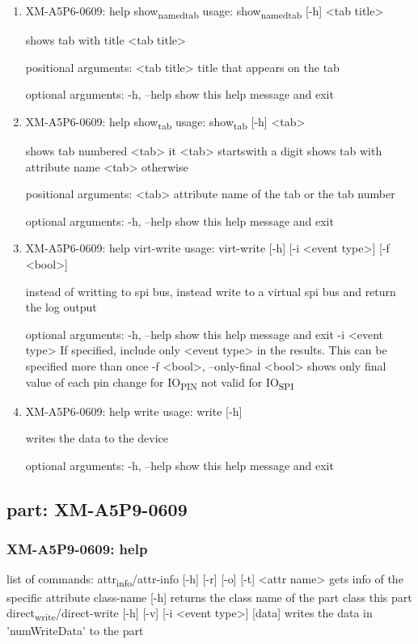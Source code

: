 \documentclass[11pt]{article}
\begin{document}
\begin{enumerate}
\item XM-A5P6-0609: help show\textsubscript{named}\textsubscript{tab}
\label{sec:orga716609}
usage: show\textsubscript{named}\textsubscript{tab} [-h] <tab title>

shows tab with title <tab title>

positional arguments:
  <tab title>  title that appears on the tab

optional arguments:
  -h, --help   show this help message and exit

\item XM-A5P6-0609: help show\textsubscript{tab}
\label{sec:org35d2d2b}
usage: show\textsubscript{tab} [-h] <tab>

shows tab numbered <tab> it <tab> startswith a digit shows tab with attribute
name <tab> otherwise

positional arguments:
  <tab>       attribute name of the tab or the tab number

optional arguments:
  -h, --help  show this help message and exit

\item XM-A5P6-0609: help virt-write
\label{sec:orgcb5853d}
usage: virt-write [-h] [-i <event type>] [-f <bool>]

instead of writting to spi bus, instead write to a virtual spi bus and return
the log output

optional arguments:
  -h, --help            show this help message and exit
  -i <event type>       If specified, include only <event type> in the
                        results. This can be specified more than once
  -f <bool>, --only-final <bool>
                        shows only final value of each pin change for IO\textsubscript{PIN}
                        not valid for IO\textsubscript{SPI}

\item XM-A5P6-0609: help write
\label{sec:org8fb0491}
usage: write [-h]

writes the data to the device

optional arguments:
  -h, --help  show this help message and exit
\end{enumerate}

\subsection{part: XM-A5P9-0609}
\label{sec:org3a604e2}
\subsubsection{XM-A5P9-0609: help}
\label{sec:org81358bc}
list of commands:
  attr\textsubscript{info}/attr-info [-h] [-r] [-o] [-t] <attr name>
    gets info of the specific attribute
  class-name [-h]
    returns the class name of the part class this part
  direct\textsubscript{write}/direct-write [-h] [-v] [-i <event type>] [data]
    writes the data in 'numWriteData' to the part
\end{document}
